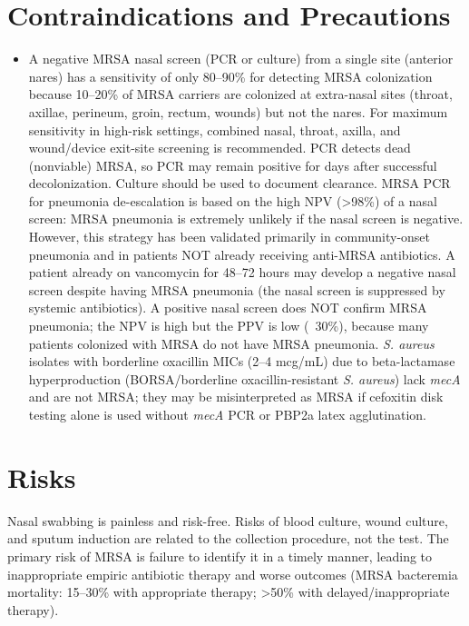 \section*{Contraindications and Precautions}
\begin{itemize}
  \item A negative MRSA nasal screen (PCR or culture) from a single site (anterior nares) has a sensitivity of only 80--90\% for detecting MRSA colonization because 10--20\% of MRSA carriers are colonized at extra-nasal sites (throat, axillae, perineum, groin, rectum, wounds) but not the nares. For maximum sensitivity in high-risk settings, combined nasal, throat, axilla, and wound/device exit-site screening is recommended. PCR detects dead (nonviable) MRSA, so PCR may remain positive for days after successful decolonization. Culture should be used to document clearance. MRSA PCR for pneumonia de-escalation is based on the high NPV (>98\%) of a nasal screen: MRSA pneumonia is extremely unlikely if the nasal screen is negative. However, this strategy has been validated primarily in community-onset pneumonia and in patients NOT already receiving anti-MRSA antibiotics. A patient already on vancomycin for 48--72 hours may develop a negative nasal screen despite having MRSA pneumonia (the nasal screen is suppressed by systemic antibiotics). A positive nasal screen does NOT confirm MRSA pneumonia; the NPV is high but the PPV is low (~30\%), because many patients colonized with MRSA do not have MRSA pneumonia. \textit{S. aureus} isolates with borderline oxacillin MICs (2--4 mcg/mL) due to beta-lactamase hyperproduction (BORSA/borderline oxacillin-resistant \textit{S. aureus}) lack \textit{mecA} and are not MRSA; they may be misinterpreted as MRSA if cefoxitin disk testing alone is used without \textit{mecA} PCR or PBP2a latex agglutination.
\end{itemize}
\section*{Risks}
Nasal swabbing is painless and risk-free. Risks of blood culture, wound culture, and sputum induction are related to the collection procedure, not the test. The primary risk of MRSA is failure to identify it in a timely manner, leading to inappropriate empiric antibiotic therapy and worse outcomes (MRSA bacteremia mortality: 15--30\% with appropriate therapy; >50\% with delayed/inappropriate therapy).

